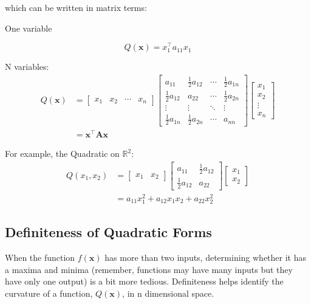 \documentclass[
  letterpaper,
]{book}
\theoremstyle{definition}
\theoremstyle{definition}
\theoremstyle{plain}
\theoremstyle{definition}
\theoremstyle{plain}
\theoremstyle{plain}
\theoremstyle{remark}
\begin{document}
which can be written in matrix terms:

One variable

\[Q(\mathbf{x}) = x_1^\top a_{11} x_1\]

N variables: \begin{align*}
Q(\mathbf{x}) &=\begin{bmatrix} x_1 & x_2 & \cdots & x_n \end{bmatrix}\begin{bmatrix}
a_{11}&\frac{1}{2}a_{12}&\cdots&\frac{1}{2}a_{1n}\\
\frac{1}{2}a_{12}&a_{22}&\cdots&\frac{1}{2}a_{2n}\\
\vdots&\vdots&\ddots&\vdots\\
\frac{1}{2}a_{1n}&\frac{1}{2}a_{2n}&\cdots&a_{nn}
\end{bmatrix}
\begin{bmatrix} x_1\\x_2\\\vdots\\x_n\end{bmatrix}\\
&= \mathbf{x}^\top\mathbf{Ax}
\end{align*}

For example, the Quadratic on \(\mathbb{R}^2\): \begin{align*}
  Q(x_1,x_2)&=\begin{bmatrix} x_1& x_2 \end{bmatrix} \begin{bmatrix} a_{11}&\frac{1}{2} a_{12}\\
  \frac{1}{2}a_{12}&a_{22}\end{bmatrix} \begin{bmatrix} x_1\\x_2 \end{bmatrix} \\
  &= a_{11}x_1^2 + a_{12}x_1x_2 + a_{22}x_2^2
\end{align*}

\hypertarget{definiteness-of-quadratic-forms}{%
\subsection*{Definiteness of Quadratic
Forms}\label{definiteness-of-quadratic-forms}}

When the function \(f(\mathbf{x})\) has more than two inputs,
determining whether it has a maxima and minima (remember, functions may
have many inputs but they have only one output) is a bit more tedious.
Definiteness helps identify the curvature of a function,
\(Q(\textbf{x})\), in n dimensional space.
\end{document}
